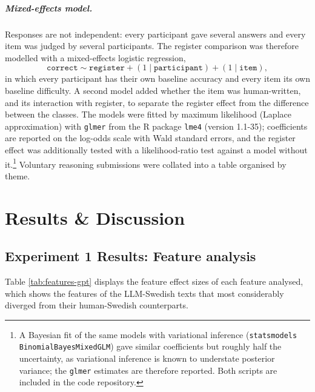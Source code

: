 \documentclass[thesis]{cluu}
\begin{document}
\paragraph{Mixed-effects model.} Responses are not independent: every participant gave several answers and every item was judged by several participants. The register comparison was therefore modelled with a mixed-effects logistic regression,
\begin{equation}
\texttt{correct} \sim \texttt{register} + (1 \mid \texttt{participant}) + (1 \mid \texttt{item}),
\end{equation}
in which every participant has their own baseline accuracy and every item its own baseline difficulty. A second model added whether the item was human-written, and its interaction with register, to separate the register effect from the difference between the classes. The models were fitted by maximum likelihood (Laplace approximation) with \texttt{glmer} from the R package \texttt{lme4} (version 1.1-35); coefficients are reported on the log-odds scale with Wald standard errors, and the register effect was additionally tested with a likelihood-ratio test against a model without it.\footnote{A Bayesian fit of the same models with variational inference (\texttt{statsmodels} \texttt{BinomialBayesMixedGLM}) gave similar coefficients but roughly half the uncertainty, as variational inference is known to understate posterior variance; the \texttt{glmer} estimates are therefore reported. Both scripts are included in the code repository.} Voluntary reasoning submissions were collated into a table organised by theme.

\chapter{Results \& Discussion}

\section{Experiment 1 Results: Feature analysis}
Table \ref{tab:features-gpt} displays the feature effect sizes of each feature analysed, which shows the features of the LLM-Swedish texts that most considerably diverged from their human-Swedish counterparts.
\end{document}
